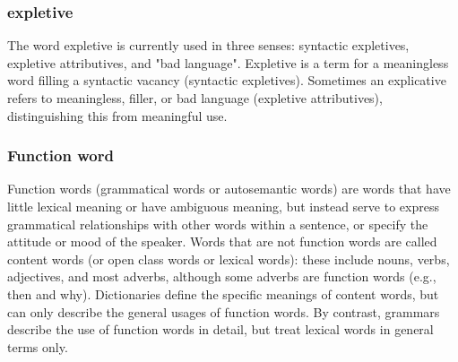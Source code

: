 \begin{small}
\subsubsection{expletive}
The word expletive is currently used in three senses: syntactic expletives, expletive attributives, and "bad language". Expletive is a term for a meaningless word filling a syntactic vacancy (syntactic expletives).  Sometimes an explicative refers to meaningless, filler, or bad language (expletive attributives), distinguishing this from meaningful use.

\subsubsection{Function word}
Function words (grammatical words or autosemantic words) are words that have little lexical meaning or have ambiguous meaning, but instead serve to express grammatical relationships with other words within a sentence, or specify the attitude or mood of the speaker. Words that are not function words are called content words (or open class words or lexical words): these include nouns, verbs, adjectives, and most adverbs, although some adverbs are function words (e.g., then and why). Dictionaries define the specific meanings of content words, but can only describe the general usages of function words. By contrast, grammars describe the use of function words in detail, but treat lexical words in general terms only.


\end{small}
